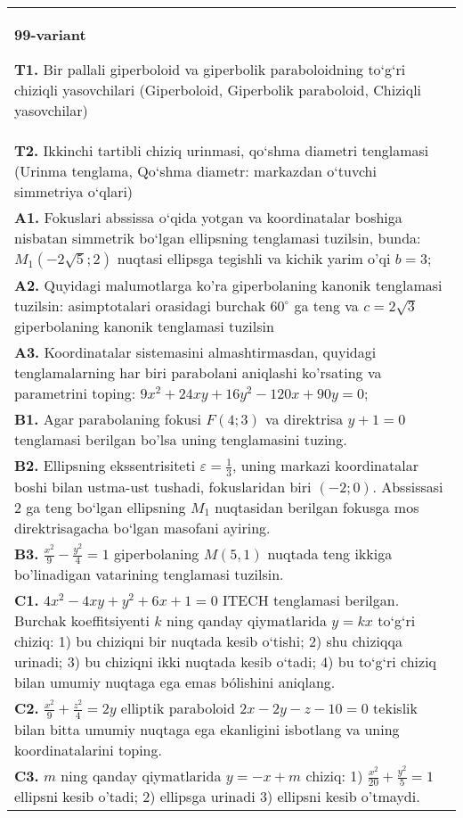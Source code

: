 \documentclass{article}
\begin{document}
\begin{tabular}{m{17cm}}
\textbf{99-variant}
\newline

\textbf{T1.} Bir pallali giperboloid va giperbolik paraboloidning to‘g‘ri chiziqli yasovchilari (Giperboloid, Giperbolik paraboloid, Chiziqli yasovchilar) \\
\textbf{T2.} Ikkinchi tartibli chiziq urinmasi, qo‘shma diametri tenglamasi (Urinma tenglama, Qo‘shma diametr: markazdan o‘tuvchi simmetriya o‘qlari) \\
\textbf{A1.} Fokuslari abssissa o‘qida yotgan va koordinatalar boshiga nisbatan simmetrik bo‘lgan ellipsning tenglamasi tuzilsin, bunda: $M_1(-2 \sqrt{5} ; 2)$ nuqtasi ellipsga tegishli va kichik yarim o'qi $b=3$; \\
\textbf{A2.} Quyidagi malumotlarga ko'ra giperbolaning kanonik tenglamasi tuzilsin: asimptotalari orasidagi burchak $60^{\circ}$ ga teng va $c=2 \sqrt{3}$ giperbolaning kanonik tenglamasi tuzilsin \\
\textbf{A3.} Koordinatalar sistemasini almashtirmasdan, quyidagi tenglamalarning har biri parabolani aniqlashi ko'rsating va parametrini toping: $9 x^2+24 x y+16 y^2-120 x+90 y=0$; \\
\textbf{B1.} Agar parabolaning fokusi $F (4;3) $ va direktrisa $y+1=0$ tenglamasi berilgan bo'lsa uning tenglamasini tuzing. \\
\textbf{B2.} Ellipsning ekssentrisiteti $\varepsilon=\frac{1}{3}$, uning markazi koordinatalar boshi bilan ustma-ust tushadi, fokuslaridan biri $ (-2; 0) $. Abssissasi 2 ga teng bo‘lgan ellipsning $M_1$ nuqtasidan berilgan fokusga mos direktrisagacha bo‘lgan masofani ayiring. \\
\textbf{B3.} $\frac{x^2}{9}-\frac{y^2}{4}=1$ giperbolaning $M(5,1)$ nuqtada teng ikkiga bo'linadigan vatarining tenglamasi tuzilsin. \\
\textbf{C1.} $4 x^2-4 x y+y^2+6 x+1=0$ ITECH tenglamasi berilgan. Burchak koeffitsiyenti $k$ ning qanday qiymatlarida $y=kx$ to‘g‘ri chiziq: 1) bu chiziqni bir nuqtada kesib o‘tishi; 2) shu chiziqqa urinadi; 3) bu chiziqni ikki nuqtada kesib o‘tadi; 4) bu to‘g‘ri chiziq bilan umumiy nuqtaga ega emas bólishini aniqlang. \\
\textbf{C2.} $\frac{x^2}{9}+\frac{z^2}{4}=2 y$ elliptik paraboloid $2 x-2 y-z-10=0$ tekislik bilan bitta umumiy nuqtaga ega ekanligini isbotlang va uning koordinatalarini toping. \\
\textbf{C3.} $m$ ning qanday qiymatlarida $y=-x+m$ chiziq: 1) $\frac{x^2}{20}+\frac{y^2}{5}=1$ ellipsni kesib o'tadi; 2) ellipsga urinadi 3) ellipsni kesib o'tmaydi. \\

\end{tabular}
\vspace{1cm}
\end{document}
